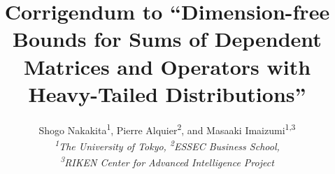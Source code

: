 \documentclass[11pt,a4paper]{article}
\title{Corrigendum to ``Dimension-free Bounds for Sums of Dependent Matrices and Operators with Heavy-Tailed Distributions''}
\author{Shogo Nakakita\textsuperscript{1}, Pierre Alquier\textsuperscript{2}, and Masaaki Imaizumi\textsuperscript{1,3}\vspace{2ex}\\
{\it \textsuperscript{1}The University of Tokyo, \textsuperscript{2}ESSEC Business School,}\\
{\it \textsuperscript{3}RIKEN Center for Advanced Intelligence Project}}
\theoremstyle{remark}
\theoremstyle{definition}
\theoremstyle{definition}
\begin{document}

\date{}
\maketitle
\end{document}
